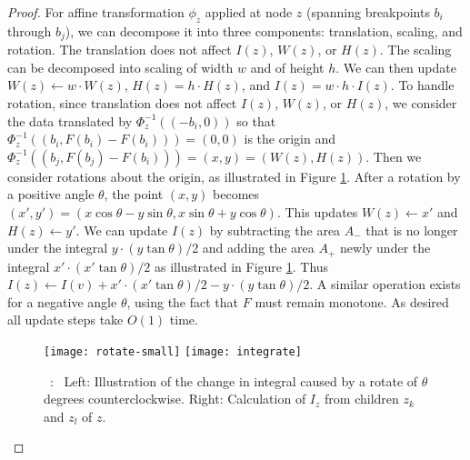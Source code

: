 \documentclass[11pt]{article}
\newcommand\myCaption[1]{\small\refstepcounter{figure}\figurename\ \thefigure :\ #1}
\begin{document}
\begin{proof}
For affine transformation $\phi_z$ applied at node $z$ (spanning breakpoints $b_i$ through $b_j$), we can decompose it into three components: translation, scaling, and rotation.  
The translation does not affect $I(z)$, $W(z)$, or $H(z)$.  
The scaling can be decomposed into scaling of width $w$ and of height $h$.  We can then update $W(z) \leftarrow w \cdot W(z)$, $H(z) = h \cdot H(z)$, and $I(z) = w\cdot h\cdot I(z)$.  
To handle rotation, since translation does not affect $I(z)$, $W(z)$, or $H(z)$, we consider the data translated by $\Phi_z^{-1}((-b_i, 0))$ so that $\Phi_z^{-1}((b_i, F(b_i)-F(b_i))) = (0,0)$ is the origin and $\Phi_z^{-1}((b_j, F(b_j)-F(b_i))) = (x,y) = (W(z), H(z))$.  Then we consider rotations about the origin, as illustrated in Figure \ref{fig:rotate}.  
After a rotation by a positive angle $\theta$, the point $(x,y)$ becomes $(x', y') = (x \cos \theta - y \sin \theta, x \sin \theta + y \cos \theta)$.  This updates $W(z) \leftarrow x'$ and $H(z) \leftarrow y'$.  We can update $I(z)$ by subtracting the area $A_-$ that is no longer under the integral $y \cdot (y \tan \theta)/2$ and adding the area $A_+$ newly under the integral $x' \cdot (x' \tan \theta)/2$ as illustrated in Figure \ref{fig:rotate}.  Thus $I(z) \leftarrow I(v) + x' \cdot (x' \tan \theta)/2 - y \cdot (y \tan \theta)/2$.  A similar operation exists for a negative angle $\theta$, using the fact that $F$ must remain monotone.
As desired all update steps take $O(1)$ time.

\begin{figure}[h]
\begin{center}
\texttt{[image: rotate-small]} 
\hspace{.8in}
\texttt{[image: integrate]}
\end{center}
\myCaption{\label{fig:rotate} Left: Illustration of the change in integral caused by a rotate of $\theta$ degrees counterclockwise. 
Right: Calculation of $I_z$ from children $z_k$ and $z_l$ of $z$.}
\end{figure}



\end{proof}
\end{document}
